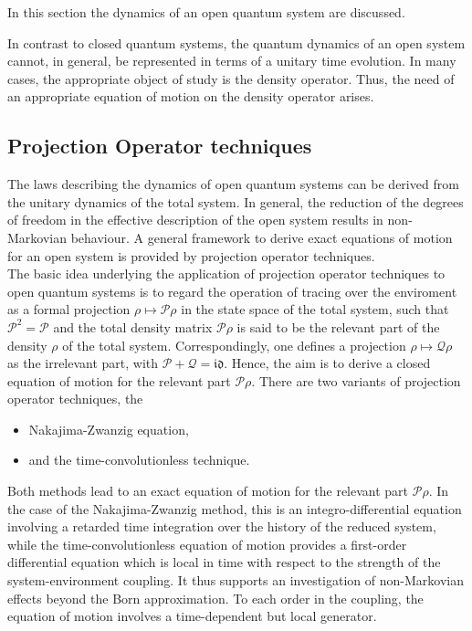 \documentclass{homework}
\begin{document}
In this section the dynamics of an open quantum system are discussed. 

\begin{tcolorbox}[colback = yellow, title = Physical Context]

In contrast to closed quantum systems, the quantum dynamics of  an open system cannot, in general, be represented in terms of a unitary time evolution. In many cases, the appropriate object of study is the density operator. Thus, the need of an appropriate equation of motion on the density operator arises. 

\end{tcolorbox}

\subsection{Projection Operator techniques }

The laws describing the dynamics of open quantum systems can be derived from the unitary dynamics of the total system. In general, the reduction of the degrees of freedom in the effective description of the open system results in non-Markovian behaviour. A general framework to derive exact equations of motion for an open system is provided by projection operator techniques. \\

The basic idea underlying the application of projection operator techniques to open quantum systems is to regard the operation of tracing over the enviroment as a formal projection $\rho \mapsto \bm{\mathcal{P}} \rho$ in the state space of the total system, such that $\bm{\mathcal{P}}^2  =\bm{\mathcal{P}}$ and the total density matrix $\bm{\mathcal{P}} \rho$ is said to be the relevant part of the density $\rho$ of the total system. Correspondingly, one defines a projection $\rho \mapsto \bm{\mathcal{Q}}\rho$ as the irrelevant part, with $\bm{\mathcal{P}} + \bm{\mathcal{Q}} = \mathfrak{i}\mathfrak{d}$. Hence, the aim is to derive a closed equation of motion for the relevant part $\bm{\mathcal{P}} \rho$. There are two variants of projection operator techniques, the 

\begin{itemize}
    \item Nakajima-Zwanzig equation, 
    \item and the time-convolutionless technique. 
\end{itemize}

Both methods lead to an exact equation of motion for the relevant part $\bm{\mathcal{P}} \rho$. In the case of the Nakajima-Zwanzig method, this is an integro-differential equation involving a retarded time integration over the history of the reduced system, while the time-convolutionless equation of motion provides a first-order differential equation which is local in time with respect to the strength of the system-environment coupling. It thus supports an investigation of non-Markovian effects beyond the Born approximation. To each order in the coupling, the equation of motion involves a time-dependent but local generator. \\
\end{document}
